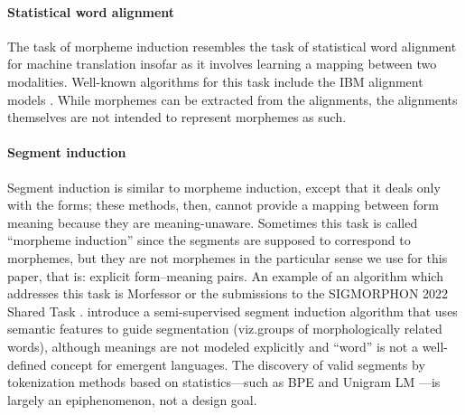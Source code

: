 \paragraph{Statistical word alignment}
The task of morpheme induction resembles the task of statistical word alignment for machine translation insofar as it involves learning a mapping between two modalities.
Well-known algorithms for this task include the IBM alignment models \citep{ibm-model-1}.
While morphemes can be extracted from the alignments, the alignments themselves are not intended to represent morphemes as such.

\paragraph{Segment induction}
Segment induction is similar to morpheme induction, except that it deals only with the forms;
  these methods, then, cannot provide a mapping between form meaning because they are meaning-unaware.
Sometimes this task is called ``morpheme induction'' since the segments are supposed to correspond to morphemes, but they are not morphemes in the particular sense we use for this paper, that is: explicit form--meaning pairs.
An example of an algorithm which addresses this task is Morfessor \citep{creutz-lagus-2002-unsupervised,morfessor2} or the submissions to the SIGMORPHON 2022 Shared Task \citet{batsuren-etal-2022-sigmorphon}.
\citet{narasimhan-etal-2015-unsupervised} introduce a semi-supervised segment induction algorithm that uses semantic features to guide segmentation (viz.\@ groups of morphologically related words), although meanings are not modeled explicitly and ``word'' is not a well-defined concept for emergent languages.
The discovery of valid segments by tokenization methods based on statistics---such as BPE \citep{sennrich-etal-2016-neural,gage1994bpe} and Unigram LM \citep{kudo-2018-subword}---is largely an epiphenomenon, not a design goal.

